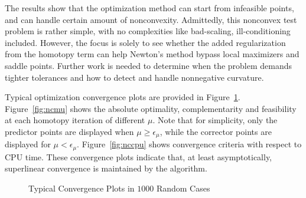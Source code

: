   
  
The results show that the optimization method can start from infeasible points, and can handle certain 
amount of nonconvexity.  Admittedly, this nonconvex test problem is rather simple, with no complexities like bad-scaling, ill-conditioning included. However, the focus is solely to see whether the added regularization from the homotopy term can help 
Newton's method bypass local maximizers and saddle points.  Further work is needed to determine when the problem demands 
tighter tolerances and how to detect and handle nonnegative curvature.  


Typical optimization convergence plots are provided in Figure~\ref{fig:nc_converg}. Figure~\ref{fig:ncmu} 
shows the absolute optimality, complementarity and feasibility at each homotopy iteration of different $\mu$. 
Note that for simplicity, only the predictor points are displayed when $\mu \geq \epsilon_{\mu}$, 
while the corrector points are displayed for $\mu < \epsilon_{\mu}$.
Figure~\ref{fig:nccpu} shows convergence criteria with respect to  CPU time. 
These convergence plots indicate that, at least asymptotically, superlinear convergence is maintained by the algorithm.

\begin{figure}[tbp]
  \centering
   \hspace{1em}
   \caption{Typical Convergence Plots in $1000$ Random Cases \label{fig:nc_converg}}
\end{figure}

